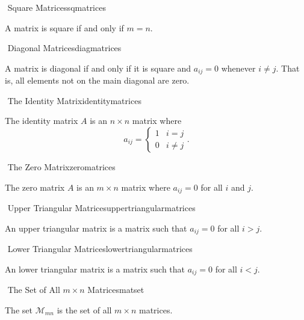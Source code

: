         \begin{definition}{\Stop\,\,Square Matrices}{sqmatrices}
        
            A matrix is square if and only if \(m=n\).
        
        \end{definition}
        \begin{definition}{\Stop\,\,Diagonal Matrices}{diagmatrices}
        
            A matrix is diagonal if and only if it is square and \(a_{ij}=0\) whenever \(i\neq j\). That is, all elements not on the main diagonal are zero.
        
        \end{definition}
        \begin{definition}{\Stop\,\,The Identity Matrix}{identitymatrices}
        
            The identity matrix \(A\) is an \(n\times n\) matrix where
            \begin{equation*}
                a_{ij}=\begin{cases} 1 & i=j \\ 0 & i\neq j \end{cases}.
            \end{equation*}
        
        \end{definition}
        \begin{definition}{\Stop\,\,The Zero Matrix}{zeromatrices}
        
            The zero matrix \(A\) is an \(m\times n\) matrix where \(a_{ij}=0\) for all \(i\) and \(j\).
            
        \end{definition}
        \begin{definition}{\Stop\,\,Upper Triangular Matrices}{uppertriangularmatrices}
        
            An upper triangular matrix is a matrix such that \(a_{ij}=0\) for all \(i>j\).
            
        \end{definition}
        \begin{definition}{\Stop\,\,Lower Triangular Matrices}{lowertriangularmatrices}
        
            An lower triangular matrix is a matrix such that \(a_{ij}=0\) for all \(i<j\).
            
        \end{definition}
        \begin{definition}{\Stop\,\,The Set of All \(m\times n\) Matrices}{matset}
        
            The set \(\mathcal{M}_{mn}\) is the set of all \(m\times n\) matrices.
            
        \end{definition}
